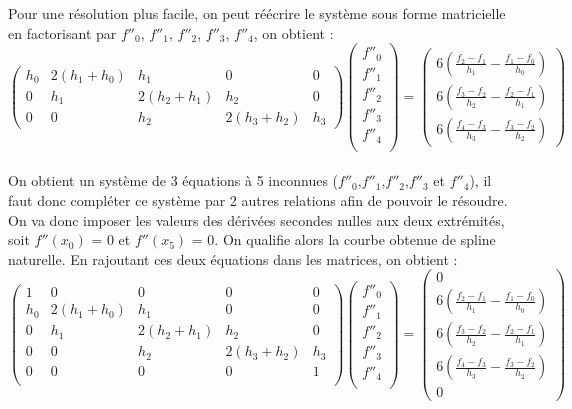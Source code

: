 \documentclass{article}
\begin{document}
Pour une r\'{e}solution plus facile, on peut r\'{e}\'{e}crire le syst\`{e}me sous forme matricielle en factorisant par $f''_0$, $f''_1$, $f''_2$, $f''_3$, $f''_4$, 
on obtient :
\[\begin{pmatrix}
     h_0 & 2(h_1+h_0) & h_1 & 0 & 0 \\
   0 & h_1 & 2(h_2+h_1) & h_2 & 0 \\
   0 & 0 & h_2 & 2(h_3+h_2) & h_3 
 \end{pmatrix} 
\begin{pmatrix}
   f''_0 \\
   f''_1 \\
   f''_2 \\
   f''_3 \\
   f''_4 \\
\end{pmatrix}
=
\begin{pmatrix}
6(\frac{f_{2}-f_1}{h_1}-\frac{f_1-f_{0}}{h_{0}})\\
6(\frac{f_{3}-f_2}{h_2}-\frac{f_2-f_{1}}{h_{1}})\\
6(\frac{f_{4}-f_3}{h_3}-\frac{f_3-f_{2}}{h_{2}})
\end{pmatrix}\]
\\
On obtient un syst\`{e}me de 3 \'{e}quations \`a 5 inconnues ($f''_0$,$f''_1$,$f''_2$,$f''_3$ et $f''_4$), il faut donc compl\'{e}ter ce syst\`{e}me par 2 autres relations afin de pouvoir le r\'{e}soudre. On va donc imposer les valeurs des d\'{e}riv\'{e}es secondes nulles aux deux extr\'{e}mit\'{e}s, soit $f''(x_0)$ = 0 et $f''(x_5)$ = 0. On qualifie alors la courbe obtenue de spline naturelle. En rajoutant ces deux \'{e}quations dans les matrices, on obtient : 
\[\begin{pmatrix}
   1 & 0 & 0 & 0 & 0 \\
   h_0 & 2(h_1+h_0) & h_1 & 0 & 0 \\
   0 & h_1 & 2(h_2+h_1) & h_2 & 0 \\
   0 & 0 & h_2 & 2(h_3+h_2) & h_3 \\
   0 & 0 & 0 & 0 & 1 \\
\end{pmatrix}
\begin{pmatrix}
   f''_0 \\
   f''_1 \\
   f''_2 \\
   f''_3 \\
   f''_4 \\
\end{pmatrix}
=
\begin{pmatrix}
  0\\
6(\frac{f_{2}-f_1}{h_1}-\frac{f_1-f_{0}}{h_{0}})\\
6(\frac{f_{3}-f_2}{h_2}-\frac{f_2-f_{1}}{h_{1}})\\
6(\frac{f_{4}-f_3}{h_3}-\frac{f_3-f_{2}}{h_{2}})\\
0
\end{pmatrix}\]
\end{document}

